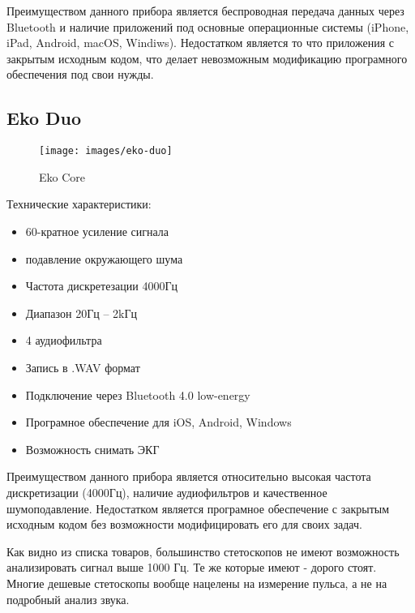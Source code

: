 \documentclass[../main.tex]{subfiles}
\begin{document}
Преимуществом данного прибора является беспроводная передача данных через Bluetooth и наличие приложений под основные операционные системы (iPhone, iPad, Android, macOS, Windiws). Недостатком является то что приложения с закрытым исходным кодом, что делает невозможным модификацию програмного обеспечения под свои нужды.

\subsection{Eko Duo}
\begin{figure}[H]
\centering
\texttt{[image: images/eko-duo]}
\caption{Eko Core}
\end{figure}

Технические характеристики:\cite{eko-duo}
\begin{itemize}
  \item 60-кратное усиление сигнала
  \item подавление окружающего шума
  \item Частота дискретезации 4000Гц
  \item Диапазон 20Гц – 2kГц
  \item 4 аудиофильтра
  \item Запись в .WAV формат
  \item Подключение через Bluetooth 4.0 low-energy
  \item Програмное обеспечение для iOS, Android, Windows
  \item Возможность снимать ЭКГ
\end{itemize}

Преимуществом данного прибора является относительно высокая частота дискретизации (4000Гц), наличие аудиофильтров и качественное шумоподавление. Недостатком является програмное обеспечение с закрытым исходным кодом без возможности модифицировать его для своих задач.

Как видно из списка товаров, большинство стетоскопов не имеют возможность анализировать сигнал выше 1000 Гц. Те же которые имеют - дорого стоят. Многие дешевые стетоскопы вообще нацелены на измерение пульса, а не на подробный анализ звука.
\newpage
\end{document}

